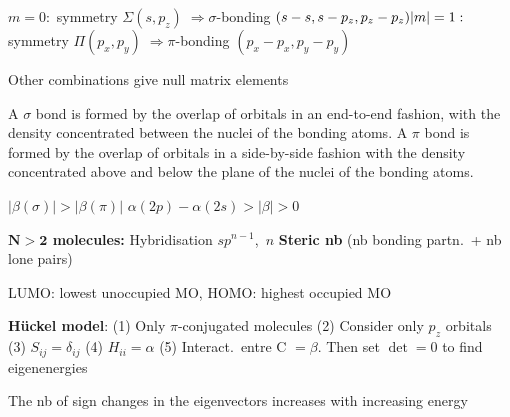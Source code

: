 \begin{squishlist}
    \item
    \begin{minipage}{0.7\columnwidth}
        $m=0 : $ symmetry $ \Sigma (s, p_z) \;  \Longrightarrow \sigma$-bonding $(s-s, s-p_z, p_z-p_z) \\
        |m|=1 : $ symmetry $ \Pi (p_x, p_y) \; \Longrightarrow \pi$-bonding $(p_x-p_x, p_y-p_y)$
    \end{minipage}
    \vline
    \hspace{0.05cm}
    \begin{minipage}{0.3\columnwidth}
        Other combinations give null matrix elements
    \end{minipage}
    \item A $\sigma$ bond is formed by the overlap of orbitals in an end-to-end fashion, with the \elec density concentrated between the nuclei of the bonding atoms. A $\pi$  bond is formed by the overlap of orbitals in a side-by-side fashion with the \elec density concentrated above and below the plane of the nuclei of the bonding atoms.
    \item $|\beta(\sigma)| > |\beta(\pi)|$ \qquad $\alpha(2p) - \alpha(2s) > |\beta| > 0$
\end{squishlist}

\squishline

\begin{squishlist}
    \item \textbf{$\mathbf{N>2}$ molecules:} Hybridisation $sp^{n-1}$,\, $n$ \textbf{Steric nb} (nb bonding partn.\ + nb lone pairs)
    \item LUMO: lowest unoccupied MO, HOMO: highest occupied MO
    \item \textbf{Hückel model}: (1) Only $\pi$-conjugated molecules (2) Consider only $p_z$ orbitals (3) $S_{ij} = \delta_{ij}$ (4) $H_{ii} = \alpha$ (5) Interact.\ entre C $=\beta$. \quad Then set $\det =0$ to find eigenenergies
    \item The nb of sign changes in the eigenvectors increases with increasing energy
\end{squishlist}

